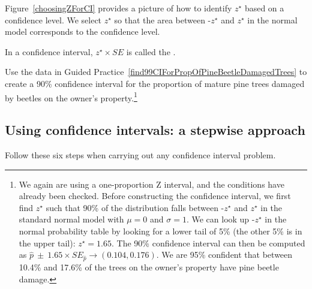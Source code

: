 Figure~\ref{choosingZForCI} provides a picture of how to identify $z^{\star}$ based on a confidence level. We select $z^{\star}$ so that the area between -$z^{\star}$ and $z^{\star}$ in the normal model corresponds to the confidence level.

\begin{termBox}{
\label{marginOfErrorTermBox}In a confidence interval, $z^{\star}\times SE$ is called the .}
\end{termBox}

\begin{exercise}\label{find90CIForPropOfPineBeetleDamagedTrees}
Use the data in Guided Practice~\ref{find99CIForPropOfPineBeetleDamagedTrees} to create a 90\% confidence interval for the proportion of mature pine trees damaged by beetles on the owner's property.\footnote{We again are using a one-proportion Z interval, and the conditions have already been checked. Before constructing the confidence interval, we first find $z^{\star}$ such that 90\% of the distribution falls between -$z^{\star}$ and $z^{\star}$ in the standard normal model with $\mu=0$ and $\sigma=1$. We can look up -$z^{\star}$ in the normal probability table by looking for a lower tail of 5\% (the other 5\% is in the upper tail): $z^{\star} = 1.65$. The 90\% confidence interval can then be computed as $\hat{p}\ \pm\ 1.65\times SE_{\hat{p}} \to (0.104, 0.176)$. We are 95\% confident that between 10.4\% and 17.6\% of the trees on the owner's property have pine beetle damage.}
\end{exercise}



\subsection{Using confidence intervals: a stepwise approach}

Follow these six steps when carrying out any confidence interval problem. 

